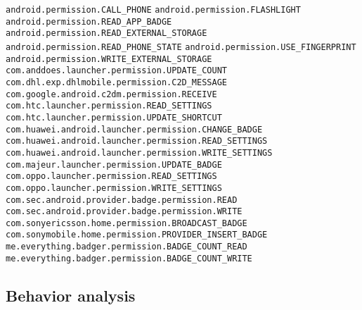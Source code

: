 \texttt{android.permission.CALL\_PHONE}
\newline \texttt{android.permission.FLASHLIGHT}
\newline \texttt{android.permission.READ\_APP\_BADGE}
\newline \texttt{android.permission.READ\_EXTERNAL\_STORAGE}
\newline \texttt{android.permission.READ\_PHONE\_STATE}
\newline \texttt{android.permission.USE\_FINGERPRINT}
\newline \texttt{android.permission.WRITE\_EXTERNAL\_STORAGE}
\newline \texttt{com.anddoes.launcher.permission.UPDATE\_COUNT}
\newline \texttt{com.dhl.exp.dhlmobile.permission.C2D\_MESSAGE}
\newline \texttt{com.google.android.c2dm.permission.RECEIVE}
\newline \texttt{com.htc.launcher.permission.READ\_SETTINGS}
\newline \texttt{com.htc.launcher.permission.UPDATE\_SHORTCUT}
\newline \texttt{com.huawei.android.launcher.permission.CHANGE\_BADGE}
\newline \texttt{com.huawei.android.launcher.permission.READ\_SETTINGS}
\newline \texttt{com.huawei.android.launcher.permission.WRITE\_SETTINGS}
\newline \texttt{com.majeur.launcher.permission.UPDATE\_BADGE}
\newline \texttt{com.oppo.launcher.permission.READ\_SETTINGS}
\newline \texttt{com.oppo.launcher.permission.WRITE\_SETTINGS}
\newline \texttt{com.sec.android.provider.badge.permission.READ}
\newline \texttt{com.sec.android.provider.badge.permission.WRITE}
\newline \texttt{com.sonyericsson.home.permission.BROADCAST\_BADGE}
\newline \texttt{com.sonymobile.home.permission.PROVIDER\_INSERT\_BADGE}
\newline \texttt{me.everything.badger.permission.BADGE\_COUNT\_READ}
\newline \texttt{me.everything.badger.permission.BADGE\_COUNT\_WRITE}



\newpage
\subsection{Behavior analysis}

